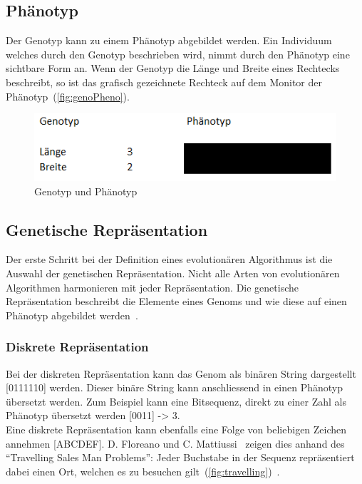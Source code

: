     \subsection{Phänotyp\label{sub:introPhenotyp}}
      Der Genotyp kann zu einem Phänotyp abgebildet werden.
      Ein Individuum welches durch den Genotyp beschrieben wird, nimmt durch den Phänotyp eine sichtbare Form an.
      Wenn der Genotyp die Länge und Breite eines Rechtecks beschreibt,
      so ist das grafisch gezeichnete Rechteck auf dem Monitor der Phänotyp~(\vref{fig:genoPheno}).

      \begin{figure}[H]
        \includegraphics[scale=1,center]{graphics/genotyp_phenotyp}
        \caption{Genotyp und Phänotyp\label{fig:genoPheno}}
      \end{figure}

    \subsection{Genetische Repräsentation}

      Der erste Schritt bei der Definition eines evolutionären Algorithmus ist die Auswahl der genetischen Repräsentation.
      Nicht alle Arten von evolutionären Algorithmen harmonieren mit jeder Repräsentation.
      Die genetische Repräsentation beschreibt die Elemente eines Genoms und
      wie diese auf einen Phänotyp abgebildet werden~\cite[S.16]{book:bioInspired}.

      \subsubsection{Diskrete Repräsentation\label{subsub:GeneticRepresentationDiscrete}}

        Bei der diskreten Repräsentation kann das Genom als binären String dargestellt [0111110] werden.
        Dieser binäre String kann anschliessend in einen Phänotyp übersetzt werden.
        Zum Beispiel kann eine Bitsequenz, direkt zu einer Zahl als Phänotyp übersetzt werden [0011] -> 3.
        \\
        Eine diskrete Repräsentation kann ebenfalls eine Folge von beliebigen Zeichen annehmen [ABCDEF].
        D. Floreano und C. Mattiussi~\cite[S.18]{book:bioInspired} zeigen dies anhand des ``Travelling Sales Man Problems'':
        Jeder Buchstabe in der Sequenz repräsentiert dabei einen Ort,
        welchen es zu besuchen gilt~(\vref{fig:travelling})~\cite[S.18]{book:bioInspired}.

